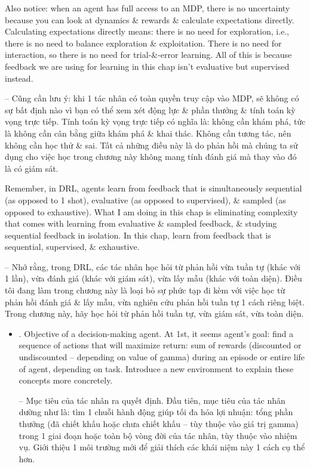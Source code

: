 \documentclass{article}
\begin{document}
\begin{itemize}
    Also notice: when an agent has full access to an MDP, there is no uncertainty because you can look at dynamics \& rewards \& calculate expectations directly. Calculating expectations directly means: there is no need for exploration, i.e., there is no need to balance exploration \& exploitation. There is no need for interaction, so there is no need for trial-\&-error learning. All of this is because feedback we are using for learning in this chap isn't evaluative but supervised instead.

    -- Cũng cần lưu ý: khi 1 tác nhân có toàn quyền truy cập vào MDP, sẽ không có sự bất định nào vì bạn có thể xem xét động lực \& phần thưởng \& tính toán kỳ vọng trực tiếp. Tính toán kỳ vọng trực tiếp có nghĩa là: không cần khám phá, tức là không cần cân bằng giữa khám phá \& khai thác. Không cần tương tác, nên không cần học thử \& sai. Tất cả những điều này là do phản hồi mà chúng ta sử dụng cho việc học trong chương này không mang tính đánh giá mà thay vào đó là có giám sát.

    Remember, in DRL, agents learn from feedback that is simultaneously sequential (as opposed to 1 shot), evaluative (as opposed to supervised), \& sampled (as opposed to exhaustive). What I am doing in this chap is eliminating complexity that comes with learning from evaluative \& sampled feedback, \& studying sequential feedback in isolation. In this chap, learn from feedback that is sequential, supervised, \& exhaustive.

    -- Nhớ rằng, trong DRL, các tác nhân học hỏi từ phản hồi vừa tuần tự (khác với 1 lần), vừa đánh giá (khác với giám sát), vừa lấy mẫu (khác với toàn diện). Điều tôi đang làm trong chương này là loại bỏ sự phức tạp đi kèm với việc học từ phản hồi đánh giá \& lấy mẫu, vừa nghiên cứu phản hồi tuần tự 1 cách riêng biệt. Trong chương này, hãy học hỏi từ phản hồi tuần tự, vừa giám sát, vừa toàn diện.
    \begin{itemize}
        \item {. Objective of a decision-making agent.} At 1st, it seems agent's goal: find a sequence of actions that will maximize return: sum of rewards (discounted or undiscounted -- depending on value of gamma) during an episode or entire life of agent, depending on task. Introduce a new environment to explain these concepts more concretely.

        -- {\sf Mục tiêu của tác nhân ra quyết định.} Đầu tiên, mục tiêu của tác nhân dường như là: tìm 1 chuỗi hành động giúp tối đa hóa lợi nhuận: tổng phần thưởng (đã chiết khấu hoặc chưa chiết khấu -- tùy thuộc vào giá trị gamma) trong 1 giai đoạn hoặc toàn bộ vòng đời của tác nhân, tùy thuộc vào nhiệm vụ. Giới thiệu 1 môi trường mới để giải thích các khái niệm này 1 cách cụ thể hơn.


\end{itemize}
\end{itemize}
\end{document}
